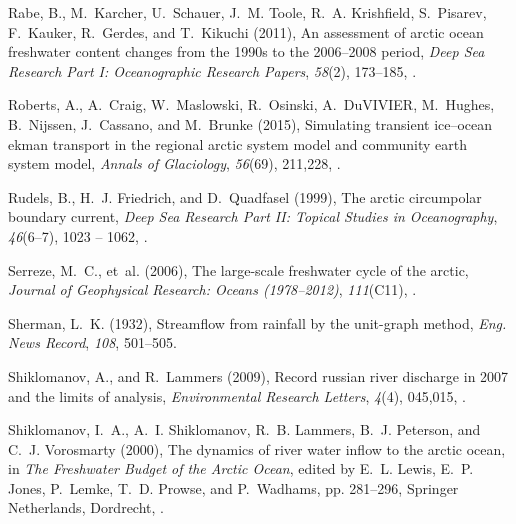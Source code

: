 \documentclass[jgrga, draft]{agutex}
\begin{document}
\begin{article}
\begin{thebibliography}{79}
Rabe, B., M.~Karcher, U.~Schauer, J.~M. Toole, R.~A. Krishfield, S.~Pisarev,
  F.~Kauker, R.~Gerdes, and T.~Kikuchi (2011), An assessment of arctic ocean
  freshwater content changes from the 1990s to the 2006--2008 period,
  \textit{Deep Sea Research Part I: Oceanographic Research Papers},
  \textit{58}(2), 173--185, .

Roberts, A., A.~Craig, W.~Maslowski, R.~Osinski, A.~DuVIVIER, M.~Hughes,
  B.~Nijssen, J.~Cassano, and M.~Brunke (2015), Simulating transient
  ice–ocean ekman transport in the regional arctic system model and community
  earth system model, \textit{Annals of Glaciology}, \textit{56}(69), 211,228,
  .

Rudels, B., H.~J. Friedrich, and D.~Quadfasel (1999), The arctic circumpolar
  boundary current, \textit{Deep Sea Research Part II: Topical Studies in
  Oceanography}, \textit{46}(6–7), 1023 -- 1062,
  .

Serreze, M.~C., et~al. (2006), The large-scale freshwater cycle of the arctic,
  \textit{Journal of Geophysical Research: Oceans (1978--2012)},
  \textit{111}(C11), .

Sherman, L.~K. (1932), Streamflow from rainfall by the unit-graph method,
  \textit{Eng. News Record}, \textit{108}, 501--505.

Shiklomanov, A., and R.~Lammers (2009), Record russian river discharge in 2007
  and the limits of analysis, \textit{Environmental Research Letters},
  \textit{4}(4), 045,015, .

Shiklomanov, I.~A., A.~I. Shiklomanov, R.~B. Lammers, B.~J. Peterson, and C.~J.
  Vorosmarty (2000), The dynamics of river water inflow to the arctic ocean, in
  \textit{The Freshwater Budget of the Arctic Ocean}, edited by E.~L. Lewis,
  E.~P. Jones, P.~Lemke, T.~D. Prowse, and P.~Wadhams, pp. 281--296, Springer
  Netherlands, Dordrecht, .


\end{thebibliography}
\end{article}
\end{document}
